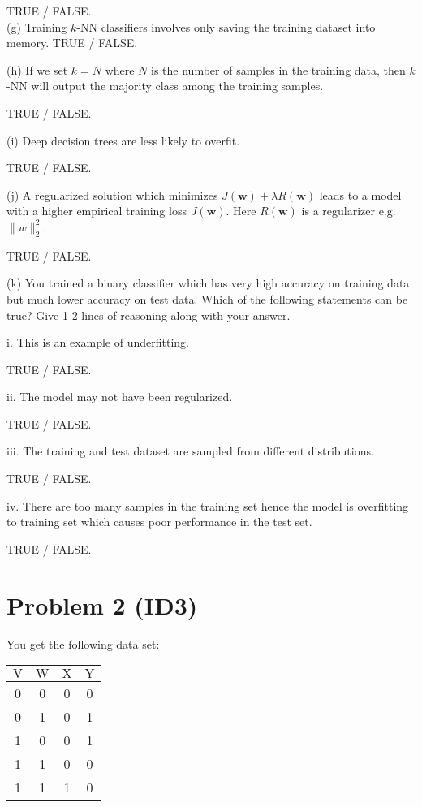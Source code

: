 \documentclass[10pt]{article}
\begin{document}
TRUE / FALSE.\\
(g) Training $k$-NN classifiers involves only saving the training dataset into memory. TRUE / FALSE.

(h) If we set $k=N$ where $N$ is the number of samples in the training data, then $k$-NN will output the majority class among the training samples.

TRUE / FALSE.

(i) Deep decision trees are less likely to overfit.

TRUE / FALSE.

(j) A regularized solution which minimizes $J(\mathbf{w})+\lambda R(\mathbf{w})$ leads to a model with a higher empirical training loss $J(\mathbf{w})$. Here $R(\mathbf{w})$ is a regularizer e.g. $\|w\|_{2}^{2}$.

TRUE / FALSE.

(k) You trained a binary classifier which has very high accuracy on training data but much lower accuracy on test data. Which of the following statements can be true? Give 1-2 lines of reasoning along with your answer.

i. This is an example of underfitting.

TRUE / FALSE.

ii. The model may not have been regularized.

TRUE / FALSE.

iii. The training and test dataset are sampled from different distributions.

TRUE / FALSE.

iv. There are too many samples in the training set hence the model is overfitting to training set which causes poor performance in the test set.

TRUE / FALSE.

\section*{Problem 2 (ID3)}
You get the following data set:

\begin{center}
\begin{tabular}{c|c|c||c}
$\mathrm{V}$ & $\mathrm{W}$ & $\mathrm{X}$ & $\mathrm{Y}$ \\
\hline
0 & 0 & 0 & 0 \\
0 & 1 & 0 & 1 \\
1 & 0 & 0 & 1 \\
1 & 1 & 0 & 0 \\
1 & 1 & 1 & 0 \\
\end{tabular}
\end{center}
\end{document}
